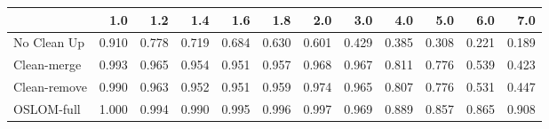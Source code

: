 \begin{tabular}{lrrrrrrrrrrr}
\toprule
{} &   1.0 &   1.2 &   1.4 &   1.6 &   1.8 &   2.0 &   3.0 &   4.0 &   5.0 &   6.0 &   7.0 \\
\midrule
No Clean Up  & 0.910 & 0.778 & 0.719 & 0.684 & 0.630 & 0.601 & 0.429 & 0.385 & 0.308 & 0.221 & 0.189 \\
Clean-merge  & 0.993 & 0.965 & 0.954 & 0.951 & 0.957 & 0.968 & 0.967 & 0.811 & 0.776 & 0.539 & 0.423 \\
Clean-remove & 0.990 & 0.963 & 0.952 & 0.951 & 0.959 & 0.974 & 0.965 & 0.807 & 0.776 & 0.531 & 0.447 \\
OSLOM-full   & 1.000 & 0.994 & 0.990 & 0.995 & 0.996 & 0.997 & 0.969 & 0.889 & 0.857 & 0.865 & 0.908 \\
\bottomrule
\end{tabular}
